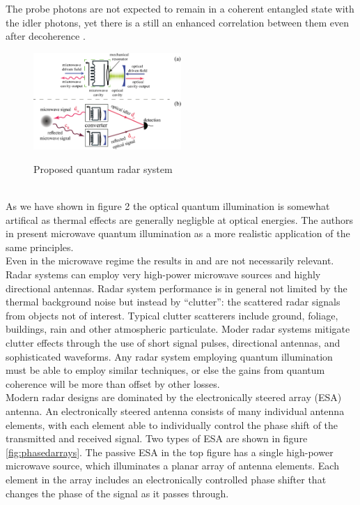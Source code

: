 \documentclass[a4paper,11pt, twocolumn]{article}
\numberwithin{equation}{section}
\begin{document}
The probe photons are not expected to remain in a coherent entangled state with the idler photons, yet there is a still an enhanced correlation between them even after decoherence \cite{qig}. 
\begin{figure}
 \caption{Proposed quantum radar system \cite{qi}}
 \centering
   \includegraphics[width=0.5\textwidth]{figs/QuantumRadar}
 \label{fig:quantumradar}
\end{figure}
\\
As we have shown in figure 2 the optical quantum illumination is somewhat artifical as thermal effects are generally negligble at optical energies.
The authors in \cite{qi} present microwave quantum illumination as a more realistic application of the same principles.
\\
Even in the microwave regime the results in \cite{qig} and \cite{qi} are not necessarily relevant. 
Radar systems can employ very high-power microwave sources and highly directional antennas.
Radar system performance is in general not limited by the thermal background noise but instead by ``clutter'': the scattered radar signals from objects not of interest.
Typical clutter scatterers include ground, foliage, buildings, rain and other atmospheric particulate.
Moder radar systems mitigate clutter effects through the use of short signal pulses, directional antennas, and sophisticated waveforms.
Any radar system employing quantum illumination must be able to employ similar techniques, or else the gains from quantum coherence will be more than offset by other losses. 
\\
Modern radar designs are dominated by the electronically steered array (ESA) antenna. 
An electronically steered antenna consists of many individual antenna elements, with each element able to individually control the phase shift of the transmitted and received signal.
Two types of ESA are shown in figure \ref{fig:phasedarrays}. The passive ESA in the top figure has a single high-power microwave source, which illuminates a planar array of antenna elements.
Each element in the array includes an electronically controlled phase shifter that changes the phase of the signal as it passes through.
\end{document}
